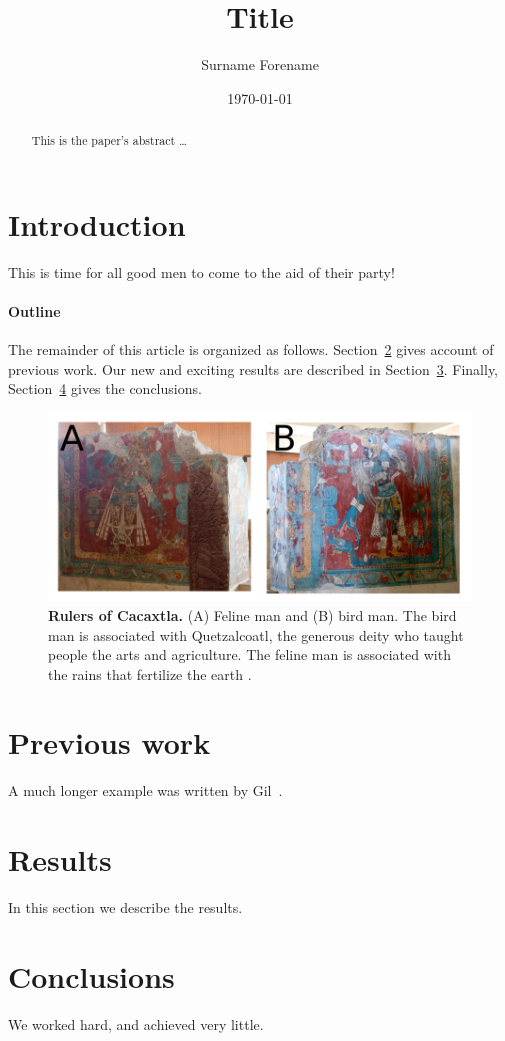\documentclass[12pt]{article}
\title{Title}
\author{Surname Forename}
\date{\today}
\begin{document}
\maketitle
\thispagestyle{empty} %



\begin{abstract}
This is the paper's abstract \ldots
\end{abstract}

\section{Introduction}
This is time for all good men to come to the aid of their party!

\paragraph{Outline}
The remainder of this article is organized as follows.
Section~\ref{previous work} gives account of previous work.
Our new and exciting results are described in Section~\ref{results}.
Finally, Section~\ref{conclusions} gives the conclusions.


\begin{figure}[!h]
\centering
\includegraphics[width=1.0\textwidth]{cacaxtlarulers}
    \caption{
	{\bf Rulers of Cacaxtla.}
	 (A) Feline man and (B) bird man.
	The bird man is associated with Quetzalcoatl, 
	the generous deity who taught people the arts and agriculture. 
	The feline man is associated with the rains that fertilize the earth \cite{wiki:cacaxtla}.
        }
\end{figure}




\section{Previous work}\label{previous work}
A much longer \LaTeXe{} example was written by Gil~\cite{Gil:02}.

\section{Results}\label{results}
In this section we describe the results.

\section{Conclusions}\label{conclusions}
We worked hard, and achieved very little.



\end{document}
